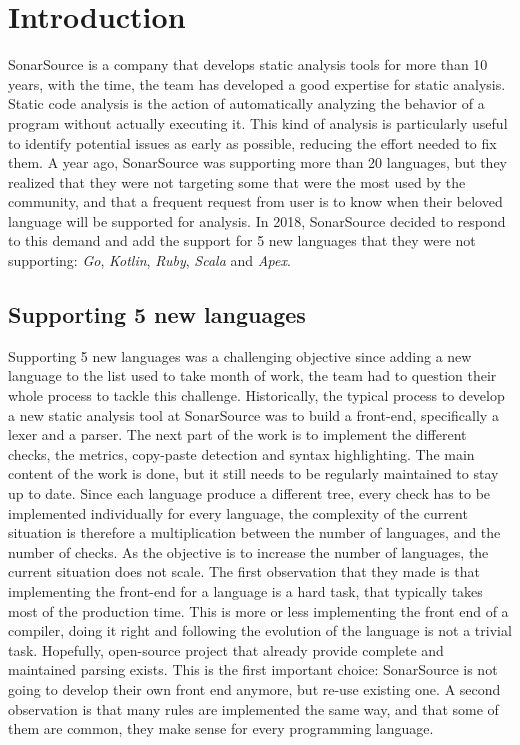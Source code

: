 \section{Introduction}
\label{sec:introduction}
SonarSource is a company that develops static analysis tools for more than 10 years, with the time, the team has developed a good expertise for static analysis.
Static code analysis is the action of automatically analyzing the behavior of a program without actually executing it.
This kind of analysis is particularly useful to identify potential issues as early as possible, reducing the effort needed to fix them.
A year ago, SonarSource was supporting more than 20 languages, but they realized that they were not targeting some that were the most used by the community, and that a frequent request from user is to know when their beloved language will be supported for analysis. 
In 2018, SonarSource decided to respond to this demand and add the support for 5 new languages that they were not supporting: \emph{Go}, \emph{Kotlin}, \emph{Ruby}, \emph{Scala} and \emph{Apex}.

\subsection{Supporting 5 new languages}
\label{subsec:5_new_languages}
Supporting 5 new languages was a challenging objective since adding a new language to the list used to take month of work, the team had to question their whole process to tackle this challenge.
Historically, the typical process to develop a new static analysis tool at SonarSource was to build a front-end, specifically a lexer and a parser.
The next part of the work is to implement the different checks, the metrics, copy-paste detection and syntax highlighting. The main content of the work is done, but it still needs to be regularly maintained to stay up to date.
Since each language produce a different tree, every check has to be implemented individually for every language, the complexity of the current situation is therefore a multiplication between the number of languages, and the number of checks.
As the objective is to increase the number of languages, the current situation does not scale.
The first observation that they made is that implementing the front-end for a language is a hard task, that typically takes most of the production time. This is more or less implementing the front end of a compiler, doing it right and following the evolution of the language is not a trivial task.
Hopefully, open-source project that already provide complete and maintained parsing exists. 
This is the first important choice: SonarSource is not going to develop their own front end anymore, but re-use existing one.
A second observation is that many rules are implemented the same way, and that some of them are common, they make sense for every programming language.


